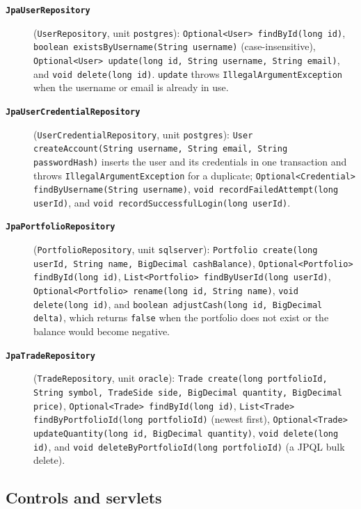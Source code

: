 \documentclass[12pt,a4paper]{article}
\newcommand{\code}[1]{\texttt{\small #1}}
\newcommand{\class}[1]{\textbf{\code{#1}}}
\begin{document}
\begin{description}
\item[\class{JpaUserRepository}] (\code{UserRepository}, unit
\code{postgres}): \code{Optional<User> findById(long id)},
\code{boolean existsByUsername(String username)} (case-insensitive),
\code{Optional<User> update(long id, String username, String email)}, and
\code{void delete(long id)}. \code{update} throws
\code{IllegalArgumentException} when the username or email is already in
use.

\item[\class{JpaUserCredentialRepository}] (\code{UserCredentialRepository},
unit \code{postgres}): \code{User createAccount(String username, String
email, String passwordHash)} inserts the user and its credentials in one
transaction and throws \code{IllegalArgumentException} for a duplicate;
\code{Optional<Credential> findByUsername(String username)},
\code{void recordFailedAttempt(long userId)}, and \code{void
recordSuccessfulLogin(long userId)}.

\item[\class{JpaPortfolioRepository}] (\code{PortfolioRepository}, unit
\code{sqlserver}): \code{Portfolio create(long userId, String name,
BigDecimal cashBalance)}, \code{Optional<Portfolio> findById(long id)},
\code{List<Portfolio> findByUserId(long userId)},
\code{Optional<Portfolio> rename(long id, String name)}, \code{void
delete(long id)}, and \code{boolean adjustCash(long id, BigDecimal delta)},
which returns \code{false} when the portfolio does not exist or the balance
would become negative.

\item[\class{JpaTradeRepository}] (\code{TradeRepository}, unit
\code{oracle}): \code{Trade create(long portfolioId, String symbol, TradeSide
side, BigDecimal quantity, BigDecimal price)}, \code{Optional<Trade>
findById(long id)}, \code{List<Trade> findByPortfolioId(long portfolioId)}
(newest first), \code{Optional<Trade> updateQuantity(long id, BigDecimal
quantity)}, \code{void delete(long id)}, and \code{void
deleteByPortfolioId(long portfolioId)} (a JPQL bulk delete).
\end{description}

\subsection{Controls and servlets}
\end{document}
